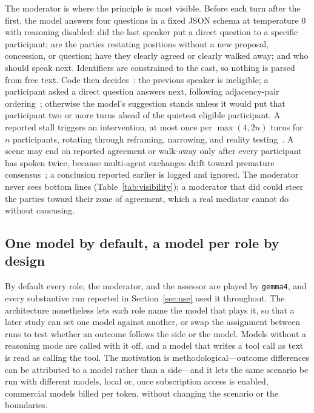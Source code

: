 \documentclass[acmsmall,screen,review]{acmart}
\newcommand{\code}[1]{\texttt{\small #1}}
\begin{document}
The moderator is where the principle is most visible. Before each turn after the first, the model answers four questions in a fixed JSON schema at temperature 0 with reasoning disabled: did the last speaker put a direct question to a specific participant; are the parties restating positions without a new proposal, concession, or question; have they clearly agreed or clearly walked away; and who should speak next. Identifiers are constrained to the cast, so nothing is parsed from free text. Code then decides~\cite{gong2026moderation}: the previous speaker is ineligible; a participant asked a direct question answers next, following adjacency-pair ordering~\cite{sacks1974turntaking,nonomura2025whospeaks}; otherwise the model's suggestion stands unless it would put that participant two or more turns ahead of the quietest eligible participant. A reported stall triggers an intervention, at most once per $\max(4, 2n)$ turns for $n$ participants, rotating through reframing, narrowing, and reality testing~\cite{fisher2011yes,johnsen2026mediation}. A scene may end on reported agreement or walk-away only after every participant has spoken twice, because multi-agent exchanges drift toward premature consensus~\cite{yao2025peacemaker,wynn2025talk}; a conclusion reported earlier is logged and ignored. The moderator never sees bottom lines (Table~\ref{tab:visibility}); a moderator that did could steer the parties toward their zone of agreement, which a real mediator cannot do without caucusing.

\subsection{One model by default, a model per role by design}

By default every role, the moderator, and the assessor are played by \code{gemma4}, and every substantive run reported in Section~\ref{sec:use} used it throughout. The architecture nonetheless lets each role name the model that plays it, so that a later study can set one model against another, or swap the assignment between runs to test whether an outcome follows the side or the model. Models without a reasoning mode are called with it off, and a model that writes a tool call as text is read as calling the tool. The motivation is methodological---outcome differences can be attributed to a model rather than a side---and it lets the same scenario be run with different models, local or, once subscription access is enabled, commercial models billed per token, without changing the scenario or the boundaries.
\end{document}
